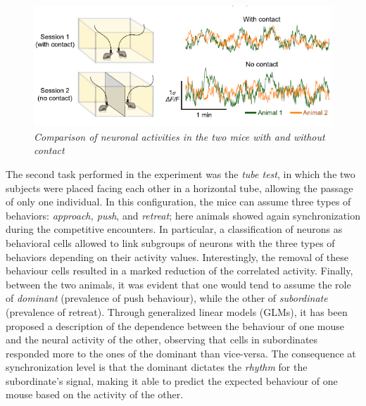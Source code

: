 \documentclass[a4paper]{article}
\begin{document}
\begin{figure}[H]
	\begin{center}
		\includegraphics[scale=.70]{kingsbury.png} 
	\end{center} 
	\caption{\textit{Comparison of neuronal activities in the two mice with and without contact}}
	
\end{figure}


The second task performed in the experiment was the \textit{tube test}, in which the two subjects were placed facing each other in a horizontal tube, allowing the passage of only one individual. In this configuration, the mice can assume three types of behaviors: \textit{approach, push}, and \textit{retreat}; here animals showed again synchronization during the competitive encounters. In particular, a classification of neurons as behavioral cells allowed to link subgroups of neurons with the three types of behaviors depending on their activity values. Interestingly, the removal of these behaviour cells resulted in a marked reduction of the correlated activity. Finally, between the two animals, it was evident that one would tend to assume the role of \textit{dominant} (prevalence of push behaviour), while the other of \textit{subordinate} (prevalence of retreat). Through generalized linear models (GLMs), it has been proposed a description of the dependence between the behaviour of one mouse and the neural activity of the other, observing that cells in subordinates responded more to the ones of the dominant than vice-versa. The consequence at synchronization level is that the dominant dictates the \textit{rhythm} for the subordinate's signal, making it able to predict the expected behaviour of one mouse based on the activity of the other.
\end{document}
